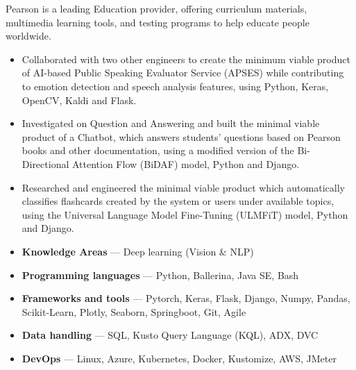 \documentclass[12pt,a4paper,withhyper]{altacv}
\begin{document}
\clearpage
{}   %
Pearson is a leading Education provider, offering curriculum materials, multimedia learning tools, and testing programs to help educate people worldwide.
\medskip
\begin{itemize}
    \item Collaborated with two other engineers to create the minimum viable product of AI-based Public Speaking Evaluator Service (APSES) while contributing to emotion detection and speech analysis features, using Python, Keras, OpenCV, Kaldi and Flask.
    \item Investigated on Question and Answering and built the minimal viable product of a Chatbot, which answers students' questions based on Pearson books and other documentation, using a modified version of the Bi-Directional Attention Flow (BiDAF) model, Python and Django.
    \item Researched and engineered the minimal viable product which automatically classifies flashcards created by the system or users under available topics, using the Universal Language Model Fine-Tuning (ULMFiT) model, Python and Django.
\end{itemize}

\medskip



\medskip


\begin{itemize}
    \item \textbf{Knowledge Areas } --- Deep learning (Vision \& NLP)
    \item \textbf{Programming languages} --- Python, Ballerina, Java SE, Bash
    \item \textbf{Frameworks and tools} --- Pytorch, Keras, Flask, Django, Numpy, Pandas, Scikit-Learn, Plotly, Seaborn, Springboot, Git, Agile
    \item \textbf{Data handling} --- SQL, Kusto Query Language (KQL), ADX, DVC
    \item \textbf{DevOps} --- Linux, Azure, Kubernetes, Docker, Kustomize, AWS, JMeter
\end{itemize}
\end{document}

